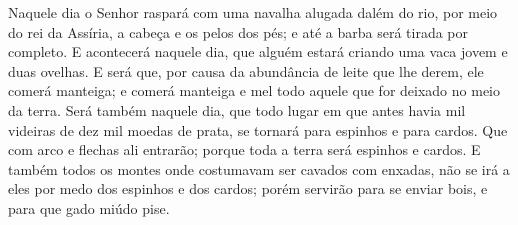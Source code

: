 {
  Naquele dia o Senhor raspará com uma navalha alugada dalém do rio, por meio do rei da Assíria, a cabeça e os pelos dos pés; e até a barba será tirada por completo.
  E acontecerá naquele dia, que alguém estará criando uma vaca jovem e duas ovelhas.
  E será que, por causa da abundância de leite que lhe derem, ele comerá manteiga; e comerá manteiga e mel todo aquele que for deixado no meio da terra.
  Será também naquele dia, que todo lugar em que antes havia mil videiras
{} de dez mil moedas de prata, se tornará
{} para espinhos e para cardos.
  Que com arco e flechas ali entrarão; porque toda a terra será espinhos e cardos.
  E também todos os montes onde costumavam ser cavados com enxadas, não se irá a eles por medo dos espinhos e dos cardos; porém servirão para se enviar bois, e para que gado miúdo pise.
\par }


